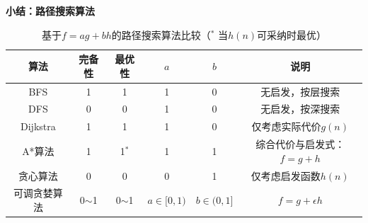 \documentclass[../main.tex]{subfiles}
\begin{document}
\textbf{小结：路径搜索算法}
\begin{table}[H]
    \centering
    \small
    \begin{tabular}{cccccc}
        \toprule
        \textbf{算法} & \textbf{完备性} & \textbf{最优性} & \textbf{$a$} & \textbf{$b$} & \textbf{说明}\\
        \midrule
        BFS & 1 & 1 & 1 & 0 & 无启发，按层搜索\\
        DFS & 0 & 0 & 1 & 0 & 无启发，按深搜索\\
        Dijkstra & 1 & 1 & 1 & 0 & 仅考虑实际代价$g(n)$\\
        A*算法 & 1 & 1$^\ast$ & 1 & 1 & 综合代价与启发式：$f=g+h$\\
        贪心算法 & 0 & 0 & 0 & 1 & 仅考虑启发函数$h(n)$\\
        可调贪婪算法 & 0$\sim$1 & 0$\sim$1 & $a\in[0,1)$ & $b\in(0,1]$ & $f=g+\epsilon h$\\
        \bottomrule
    \end{tabular}
        \caption{基于$f = a g + b h$的路径搜索算法比较（$^\ast$ 当$h(n)$可采纳时最优）}
    \label{tab:astar_compare_cn}
\end{table}
\end{document}
